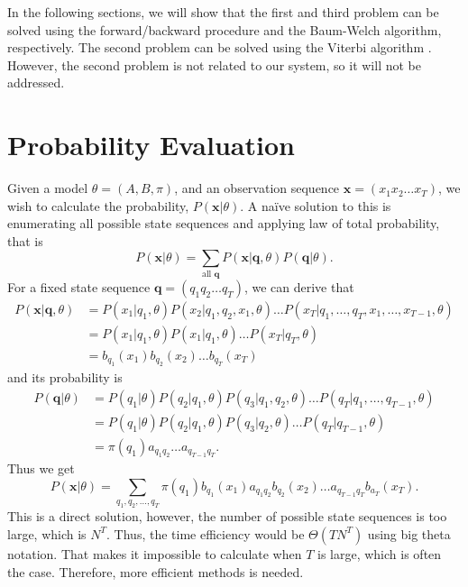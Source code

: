\documentclass[12pt,final,twoside]{report}
\theoremstyle{plain}
\theoremstyle{definition}
\theoremstyle{remark}
\begin{document}
In the following sections, we will show that the first and third problem can be solved using the forward/backward procedure and the Baum-Welch algorithm, respectively. The second problem can be solved using the Viterbi algorithm \cite{forney_viterbi_1973}. However, the second problem is not related to our system, so it will not be addressed.

\section{Probability Evaluation}
Given a model $\theta=(A, B, \pi)$, and an observation sequence $\mathbf{x} = (x_1 x_2 \dots x_T)$, we wish to calculate the probability, $P(\mathbf{x}|\theta)$. A na\"ive solution to this is enumerating all possible state sequences and applying law of total probability, that is
\begin{equation}
  P(\mathbf{x}|\theta) = \sum_{\text{all } \mathbf{q}} P(\mathbf{x}|\mathbf{q},\theta) P(\mathbf{q}|\theta) .
\end{equation}
For a fixed state sequence $\mathbf{q} = (q_1 q_2 \dots q_T)$, we can derive that
\begin{align}
  P(\mathbf{x}|\mathbf{q},\theta) &= P(x_1|q_1,\theta) P(x_2|q_1,q_2,x_1,\theta) \dots P(x_T|q_1,\dots,q_T,x_1,\dots,x_{T-1},\theta) \\
  &= P(x_1|q_1, \theta) P(x_1|q_1, \theta) \dots P(x_T|q_T, \theta) \\
  &= b_{q_1}(x_1) b_{q_2}(x_2) \dots b_{q_T}(x_T)
\end{align}
and its probability is
\begin{align}
  P(\mathbf{q}|\theta) &= P(q_1|\theta) P(q_2|q_1,\theta) P(q_3|q_1,q_2,\theta) \dots P(q_T|q_1,\dots,q_{T-1},\theta) \\
  &= P(q_1|\theta) P(q_2|q_1,\theta) P(q_3|q_2,\theta) \dots P(q_T|q_{T-1},\theta)  \\
  &= \pi(q_1) a_{q_1q_2} \dots a_{q_{T-1}q_T} .
\end{align}
Thus we get 
\begin{equation} \label{eq:prob_brute}
  P(\mathbf{x}|\theta) = \sum_{q_1,q_2,\dots,q_T} \pi(q_1) b_{q_1}(x_1) a_{q_1q_2} b_{q_2}(x_2) \dots a_{q_{T-1}q_T} b_{a_T}(x_T) .
\end{equation}
This is a direct solution, however, the number of possible state sequences is too large, which is $N^T$. Thus, the time efficiency would be $\Theta(T N^T)$ using big theta notation. That makes it impossible to calculate when $T$ is large, which is often the case. Therefore, more efficient methods is needed.
\end{document}
